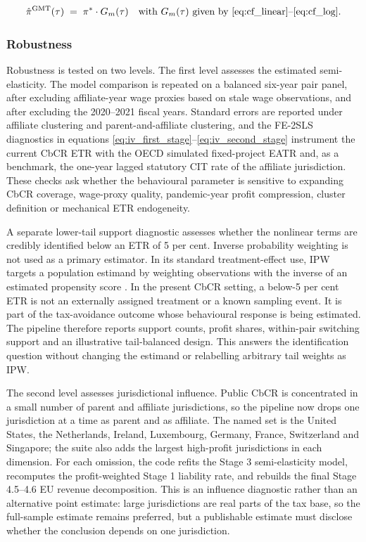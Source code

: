 \documentclass[11pt,a4paper]{article}
\begin{document}
\begin{equation}\label{eq:counterfactual_profit}
\hat{\pi}^{\text{GMT}}(\tau) \;=\; \pi^{*} \cdot G_m(\tau) \quad \text{with } G_m(\tau) \text{ given by \eqref{eq:cf_linear}--\eqref{eq:cf_log}.}
\end{equation}

\subsubsection{Robustness}\label{sec:estimation_robustness}
Robustness is tested on two levels. The first level assesses the estimated semi-elasticity. The model comparison is repeated on a balanced six-year pair panel, after excluding affiliate-year wage proxies based on stale wage observations, and after excluding the 2020--2021 fiscal years. Standard errors are reported under affiliate clustering and parent-and-affiliate clustering, and the FE-2SLS diagnostics in equations \eqref{eq:iv_first_stage}--\eqref{eq:iv_second_stage} instrument the current CbCR ETR with the OECD simulated fixed-project EATR and, as a benchmark, the one-year lagged statutory CIT rate of the affiliate jurisdiction. These checks ask whether the behavioural parameter is sensitive to expanding CbCR coverage, wage-proxy quality, pandemic-year profit compression, cluster definition or mechanical ETR endogeneity.

A separate lower-tail support diagnostic assesses whether the nonlinear terms are credibly identified below an ETR of 5 per cent. Inverse probability weighting is not used as a primary estimator. In its standard treatment-effect use, IPW targets a population estimand by weighting observations with the inverse of an estimated propensity score \citep{hirano2003}. In the present CbCR setting, a below-5 per cent ETR is not an externally assigned treatment or a known sampling event. It is part of the tax-avoidance outcome whose behavioural response is being estimated. The pipeline therefore reports support counts, profit shares, within-pair switching support and an illustrative tail-balanced design. This answers the identification question without changing the estimand or relabelling arbitrary tail weights as IPW.

The second level assesses jurisdictional influence. Public CbCR is concentrated in a small number of parent and affiliate jurisdictions, so the pipeline now drops one jurisdiction at a time as parent and as affiliate. The named set is the United States, the Netherlands, Ireland, Luxembourg, Germany, France, Switzerland and Singapore; the suite also adds the largest high-profit jurisdictions in each dimension. For each omission, the code refits the Stage 3 semi-elasticity model, recomputes the profit-weighted Stage 1 liability rate, and rebuilds the final Stage 4.5--4.6 EU revenue decomposition. This is an influence diagnostic rather than an alternative point estimate: large jurisdictions are real parts of the tax base, so the full-sample estimate remains preferred, but a publishable estimate must disclose whether the conclusion depends on one jurisdiction.
\end{document}
